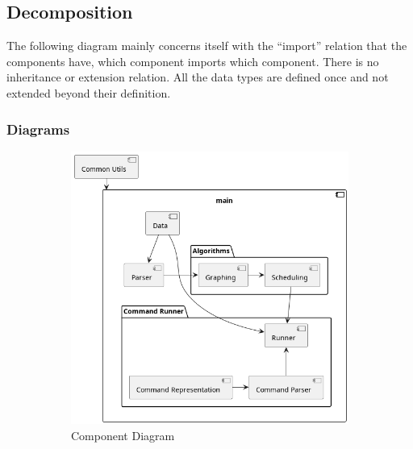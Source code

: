 \documentclass[11pt]{article}
\begin{document}
\subsection{Decomposition}

The following diagram mainly concerns itself with the ``import'' relation that
the components have, which component imports which component. There is no
inheritance or extension relation. All the data types are defined once and not
extended beyond their definition.

\subsubsection{Diagrams}

\begin{figure}[h!]
  \centering
  \begin{subfigure}{0.5\linewidth}
    \includegraphics[width=\linewidth]{diags/components.png}
    \caption{\label{fig:comp}Component Diagram}
  \end{subfigure}
  \begin{subfigure}{0.15\linewidth}

\end{subfigure}
\end{figure}
\end{document}
